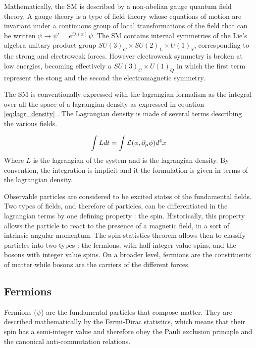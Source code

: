Mathematically, the SM is described by a non-abelian gauge quantum field theory. A gauge theory is a type of field theory whose equations of motion are invariant under a continuous group of local transformations of the field that can be written $\psi \rightarrow \psi' = e^{i\lambda(x)}\psi$. The SM contains internal symmetries of the Lie's algebra unitary product group $SU(3)_C \times SU(2)_L \times U(1)_Y$, corresponding to the strong and electroweak forces. However electroweak symmetry is broken at low energies, becoming effectively a $SU(3)_C \times U(1)_Q$ in which the first term represent the stong and the second the electromagnetic symmetry.

The SM is conventionally expressed with the lagrangian formalism as the integral over all the space of a lagrangian density as expressed in equation \ref{eq:lagr_density} \cite{Thomson:2013zua}. The Lagrangian density is made of several terms describing the various fields.

\begin{equation}
    \int L dt = \int \mathcal{L}(\phi,\partial_{\mu}\phi) d^4 x
    \label{eq:lagr_density}
\end{equation}
Where $L$ is the lagrangian of the system and \Lagr is the lagrangian density. By convention, the integration is implicit and it the formulation is given in terms of the lagrangian density.\newline

Observable particles are considered to be excited states of the fundamental fields. Two types of fields, and therefore of particles, can be differentiated in the lagrangian terms by one defining property : the spin. Historically, this property allows the particle to react to the presence of a magnetic field, in a sort of intrinsic angular momentum. The spin-statistics theorem allows then to classify particles into two types : the fermions, with half-integer value spins, and the bosons with integer value spins. On a broader level, fermions are the constituents of matter while bosons are the carriers of the different forces.

\subsection{Fermions}

Fermions ($\psi$) are the fundamental particles that compose matter. They are described mathematically by the Fermi-Dirac statistics, which means that their spin has a semi-integer value and therefore obey the Pauli exclusion principle and the canonical anti-commutation relations.

